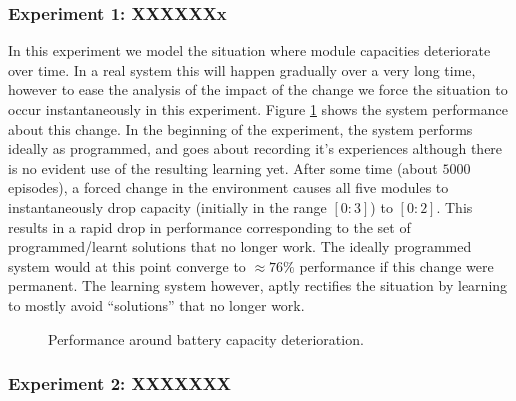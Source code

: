 \subsubsection{Experiment 1: XXXXXXx}

In this experiment we model the situation where module capacities deteriorate over time. In a real system this will happen gradually over a very long time, however to ease the analysis of the impact of the change we force the situation to occur instantaneously in this experiment. Figure \ref{fig:experiment1} shows the system performance about this change. In the beginning of the experiment, the system performs ideally as programmed, and goes about recording it's experiences although there is no evident use of the resulting learning yet. After some time (about $5000$ episodes), a forced change in the environment causes all five modules to instantaneously drop capacity (initially in the range $[0:3]$) to $[0:2]$. This results in a rapid drop in performance corresponding to the set of programmed/learnt solutions that no longer work. The ideally programmed system would at this point converge to $\approx 76\%$ performance if this change were permanent. The learning system however, aptly rectifies the situation by learning to mostly avoid ``solutions'' that no longer work. 

% 
% 



\begin{figure}[t]
\begin{center}

\end{center}
\caption{Performance around battery capacity deterioration.}
\label{fig:experiment1}
\end{figure}

\subsubsection{Experiment 2: XXXXXXX}

